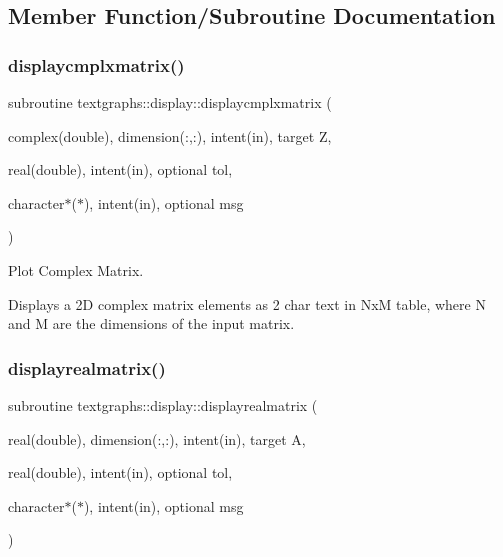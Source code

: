 \subsection{Member Function/\+Subroutine Documentation}
\mbox{\label{interfacetextgraphs_1_1display_ad87a2b0b95d37672aac96a547592b374}} 
\subsubsection{\texorpdfstring{displaycmplxmatrix()}{displaycmplxmatrix()}}
{\footnotesize\ttfamily subroutine textgraphs\+::display\+::displaycmplxmatrix (\begin{DoxyParamCaption}\item[{complex(double), dimension(\+:,\+:), intent(in), target}]{Z,  }\item[{real(double), intent(in), optional}]{tol,  }\item[{character$\ast$($\ast$), intent(in), optional}]{msg }\end{DoxyParamCaption})\hspace{0.3cm}{\ttfamily [private]}}



Plot Complex Matrix. 

Displays a 2D complex matrix elements as 2 char text in NxM table, where N and M are the dimensions of the input matrix. \mbox{\label{interfacetextgraphs_1_1display_a234a24e4326c818c2f2e274e8e3a1bee}} 
\subsubsection{\texorpdfstring{displayrealmatrix()}{displayrealmatrix()}}
{\footnotesize\ttfamily subroutine textgraphs\+::display\+::displayrealmatrix (\begin{DoxyParamCaption}\item[{real(double), dimension(\+:,\+:), intent(in), target}]{A,  }\item[{real(double), intent(in), optional}]{tol,  }\item[{character$\ast$($\ast$), intent(in), optional}]{msg }\end{DoxyParamCaption})\hspace{0.3cm}{\ttfamily [private]}}



